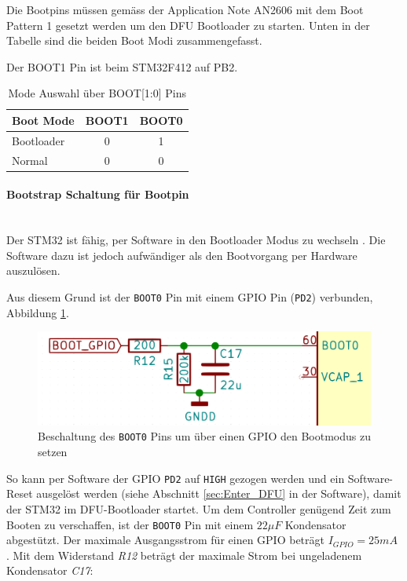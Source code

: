 Die Bootpins müssen gemäss der Application Note AN2606 \cite[Table 2]{AN2606} mit dem Boot Pattern 1 gesetzt werden um den DFU Bootloader zu starten.
Unten in der Tabelle sind die beiden Boot Modi zusammengefasst.

Der BOOT1 Pin ist beim STM32F412 auf PB2.

\begin{table}[H]
\centering
\begin{tabular}{|l|c|c|}
\hline
\textbf{Boot Mode} & \textbf{BOOT1} & \textbf{BOOT0} \\ \hline
Bootloader         & 0              & 1              \\ \hline
Normal             & 0              & 0              \\ \hline
\end{tabular}
\caption{Mode Auswahl über BOOT[1:0] Pins}
\end{table}

\paragraph{Bootstrap Schaltung für Bootpin}\vspace{-0.3cm}\\
Der STM32 ist fähig, per Software in den Bootloader Modus zu wechseln \cite{STM32-Softreset-Stackoverflow}. Die Software dazu ist jedoch aufwändiger als den Bootvorgang per Hardware auszulösen.

Aus diesem Grund ist der \texttt{BOOT0} Pin mit einem GPIO Pin (\texttt{PD2}) verbunden, Abbildung \ref{fig:Schema_Bootpin_Bootstrap}.

\begin{figure} [H]
	\begin{center}
		\includegraphics[scale=0.5]{../graphics/Schema_Bootpin_Bootstrap}
		\caption{Beschaltung des \texttt{BOOT0} Pins um über einen GPIO den Bootmodus zu setzen}
		\label{fig:Schema_Bootpin_Bootstrap}
	\end{center}
\end{figure}

So kann per Software der GPIO \texttt{PD2} auf \texttt{HIGH} gezogen werden und ein Software-Reset ausgelöst werden (siehe Abschnitt \ref{sec:Enter_DFU} in der Software), damit der STM32 im DFU-Bootloader startet.
Um dem Controller genügend Zeit zum Booten zu verschaffen, ist der \texttt{BOOT0} Pin mit einem $22\si{\mu F}$ Kondensator abgestützt. Der maximale Ausgangsstrom für einen GPIO beträgt $I_{GPIO}=25\si{mA}$ \cite[Table 14]{STM32f412}.
Mit dem Widerstand \textit{R12} beträgt der maximale Strom bei ungeladenem Kondensator \textit{C17}: 

